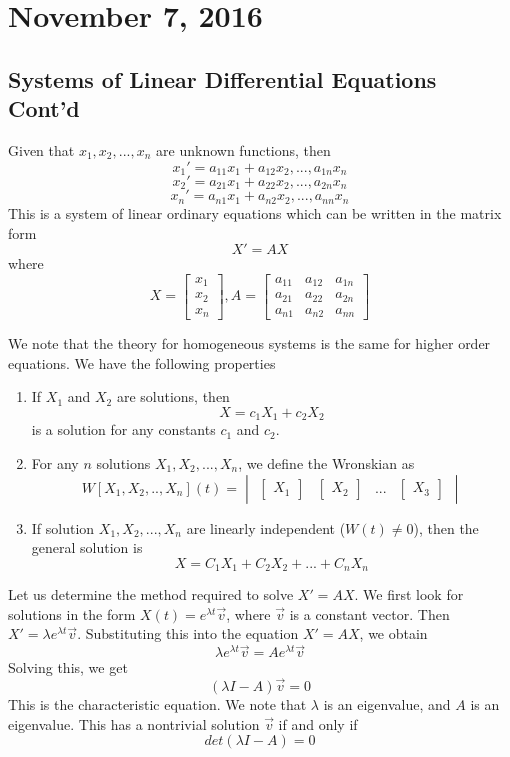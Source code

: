 \documentclass[11pt]{article}
\theoremstyle{plain} %
\theoremstyle{definition}
\theoremstyle{example}
\theoremstyle{remark}
\begin{document}
\section{November 7, 2016}
\subsection{Systems of Linear Differential Equations Cont'd}

Given that $x_1, x_2, ..., x_n$ are unknown functions, then
$$x_1' = a_{11}x_1 + a_{12}x_2, ..., a_{1n}x_n$$
$$x_2' = a_{21}x_1 + a_{22}x_2, ..., a_{2n}x_n$$
$$x_n' = a_{n1}x_1 + a_{n2}x_2, ..., a_{nn}x_n$$
This is a system of linear ordinary equations which can be written in the matrix form $$X' = AX$$ where $$X = \begin{bmatrix}x_1 \\x_2 \\ x_n\end{bmatrix}, A = \begin{bmatrix}a_{11} & a_{12} & a_{1n}\\a_{21} & a_{22} & a_{2n} \\ a_{n1} & a_{n2} & a_{nn}\end{bmatrix}$$

We note that the theory for homogeneous systems is the same for higher order equations. We have the following properties
\begin{enumerate}
\item If $X_1$ and $X_2$ are solutions, then $$X = c_1X_1 + c_2X_2$$ is a solution for any constants $c_1$ and $c_2$.
\item For any $n$ solutions $X_1, X_2, ...,X_n$, we define the Wronskian as $$W[X_1, X_2, ..,X_n](t) = \begin{vmatrix}\begin{bmatrix}X_1\end{bmatrix} & \begin{bmatrix}X_2\end{bmatrix} & ... & \begin{bmatrix}X_3\end{bmatrix}\end{vmatrix}$$
\item If solution $X_1, X_2, ..., X_n$ are linearly independent ($W(t) \neq 0$), then the general solution is $$X = C_1X_1 + C_2 X_2 + ... + C_nX_n$$
\end{enumerate}

Let us determine the method required to solve $X' = AX$. We first look for solutions in the form $X(t) = e^{\lambda t}\vec{v}$, where $\vec{v}$ is a constant vector. Then $X' = \lambda e^{\lambda t}\vec{v}$. Substituting this into the equation $X' = AX$, we obtain $$\lambda e^{\lambda t}\vec{v} = Ae^{\lambda t}\vec{v}$$ Solving this, we get $$\left( \lambda I-A\right)\vec{v} = 0$$ This is the characteristic equation. We note that $\lambda$ is an eigenvalue, and $A$ is an eigenvalue. This has a nontrivial solution $\vec{v}$ if and only if $$det(\lambda I-A) = 0$$ 
\end{document}
